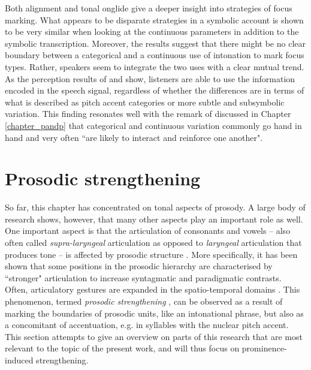 Both alignment and tonal onglide give a deeper insight into strategies of focus marking. What appears to be disparate strategies in a symbolic account is shown to be very similar when looking at the continuous parameters in addition to the symbolic transcription. Moreover, the results suggest that there might be no clear boundary between a categorical and a continuous use of intonation to mark focus types. Rather, speakers seem to integrate the two uses with a clear mutual trend. As the perception results of \citet{CangemiKrügerGrice2015} and \citet{Krüger2009} show, listeners are able to use the information encoded in the speech signal, regardless of whether the differences are in terms of what is described as pitch accent categories or more subtle and subsymbolic variation. This finding resonates well with the remark of \citet[88]{Ladd2014} discussed in Chapter \ref{chapter_pandp} that categorical and continuous variation commonly go hand in hand and very often ``are likely to interact and reinforce one another".

\section{Prosodic strengthening}
\label{sec:prosodic_strengthening}

So far, this chapter has concentrated on tonal aspects of prosody. A large body of research shows, however, that many other aspects play an important role as well. One important aspect is that the articulation of consonants and vowels -- also often called \emph{supra-laryngeal} articulation as opposed to \emph{laryngeal} articulation that produces tone -- is affected by prosodic structure \citep{Mücke2018}. More specifically, it has been shown that some positions in the prosodic hierarchy are characterised by ``stronger" articulation to increase syntagmatic and paradigmatic contrasts. Often, articulatory gestures are expanded in the spatio-temporal domains \citep{Cho2011}. This phenomenon, termed \emph{prosodic strengthening} \citep{Cho2006}, can be observed as a result of marking the boundaries of prosodic units, like an intonational phrase, but also as a concomitant of accentuation, e.g. in syllables with the nuclear pitch accent. This section attempts to give an overview on parts of this research that are most relevant to the topic of the present work, and will thus focus on prominence-induced strengthening.

